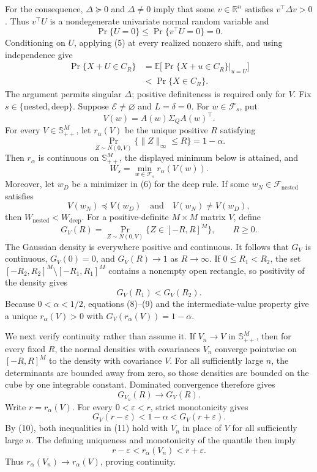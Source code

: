 For the consequence, \(\Delta\succeq0\) and \(\Delta\ne0\) imply that some
\(v\in\mathbb R^n\) satisfies \(v^{\top}\Delta v>0\).  Thus
\(v^{\top}U\) is a nondegenerate univariate normal random variable and
\[
 \Pr\{U=0\}\leq\Pr\{v^{\top}U=0\}=0. \tag{6}
\]
Conditioning on \(U\), applying (5) at every realized nonzero shift, and
using independence give
\[
\begin{aligned}
 \Pr\{X+U\in C_R\}
 &=\mathbb E\bigl[\Pr\{X+u\in C_R\}\vert_{u=U}\bigr]\\
 &<\Pr\{X\in C_R\}.
\end{aligned} \tag{7}
\]
The argument permits singular \(\Delta\); positive definiteness is required
only for \(V\).
Fix \(s\in\{\mathrm{nested},\mathrm{deep}\}\).  Suppose \(\mathcal E\ne\varnothing\) and \(L=\delta=0\).  For \(w\in\mathcal F_s\), put
\[
 V(w)=A(w)\Sigma_QA(w)^{\top}.
\]
For every \(V\in\mathbb S_{++}^M\), let \(r_\alpha(V)\) be the unique positive \(R\) satisfying
\[
 \Pr_{Z\sim N(0,V)}\{\lVert Z\rVert_\infty\leq R\}=1-\alpha.
\]
Then \(r_\alpha\) is continuous on \(\mathbb S_{++}^M\), the displayed minimum below is attained, and
\[
 W_s=\min_{w\in\mathcal F_s}r_\alpha\!\left(V(w)\right). \tag{6}
\]
Moreover, let \(w_D\) be a minimizer in (6) for the deep rule.  If some \(w_N\in\mathcal F_{\mathrm{nested}}\) satisfies
\[
 V(w_N)\preceq V(w_D)
 \quad\text{and}\quad V(w_N)\ne V(w_D), \tag{7}
\]
then \(W_{\mathrm{nested}}<W_{\mathrm{deep}}\).
For a positive-definite \(M\times M\) matrix \(V\), define
\[
 G_V(R)=\Pr_{Z\sim N(0,V)}\{Z\in[-R,R]^M\},
 \qquad R\geq0. \tag{8}
\]
The Gaussian density is everywhere positive and continuous.  It follows
that \(G_V\) is continuous, \(G_V(0)=0\), and
\(G_V(R)\to1\) as \(R\to\infty\).  If \(0\leq R_1<R_2\), the set
\([-R_2,R_2]^M\setminus[-R_1,R_1]^M\) contains a nonempty open rectangle,
so positivity of the density gives
\[
 G_V(R_1)<G_V(R_2). \tag{9}
\]
Because \(0<\alpha<1/2\), equations (8)--(9) and the intermediate-value
property give a unique \(r_\alpha(V)>0\) with
\(G_V(r_\alpha(V))=1-\alpha\).

We next verify continuity rather than assume it.  If \(V_n\to V\) in
\(\mathbb S_{++}^M\), then for every fixed \(R\), the normal densities with
covariances \(V_n\) converge pointwise on \([-R,R]^M\) to the density with
covariance \(V\).  For all sufficiently large \(n\), the determinants are
bounded away from zero, so those densities are bounded on the cube by one
integrable constant.  Dominated convergence therefore gives
\[
 G_{V_n}(R)\longrightarrow G_V(R). \tag{10}
\]
Write \(r=r_\alpha(V)\).  For every \(0<\varepsilon<r\), strict
monotonicity gives
\[
 G_V(r-\varepsilon)<1-\alpha<G_V(r+\varepsilon). \tag{11}
\]
By (10), both inequalities in (11) hold with \(V_n\) in place of \(V\) for
all sufficiently large \(n\).  The defining uniqueness and monotonicity of
the quantile then imply
\[
 r-\varepsilon<r_\alpha(V_n)<r+\varepsilon. \tag{12}
\]
Thus \(r_\alpha(V_n)\to r_\alpha(V)\), proving continuity.

